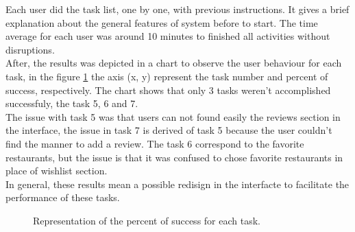 Each user did the task list, one by one, with previous instructions.
It gives a brief explanation about the general features of system
before to start. The time average for each user was around 10 minutes
to finished all activities without disruptions.\\  After, the results
was depicted in a chart to observe the user behaviour for each task,
in the figure \ref{fig:tsuccess}  the axis (x, y) represent the task
number and percent of success, respectively. The chart shows that only
3 tasks weren't accomplished successfuly, the task 5, 6 and 7. \\ The
issue with task 5 was that users can not found easily the reviews
section in the interface, the issue in task 7 is derived of task 5
because the user couldn’t find the manner to add a review. The task 6
correspond to the favorite restaurants, but the issue is that it was
confused to chose favorite restaurants in place of wishlist section.
\\ In general, these results mean a possible redisign in the
interfacte to facilitate the performance of these tasks.
\begin{figure}
\centering
\captionsetup{font=footnotesize}
\caption{Representation of the percent of success for each task.}
\label{fig:tsuccess}   
\end{figure}
